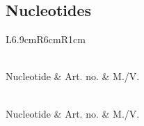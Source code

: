 \subsection{Nucleotides}
{
\setlength{\tabcolsep}{5pt}
\begin{longtable}{L{6.9cm}R{6cm}R{1cm}}
	\caption[List of Nucleotides Used in This Work]{List of nucleotides used in this work. Abbreviations: Art. no.: Article number; M./V.: Manufacturer or vendor.\label{tbl-mat-nuc}}\\
	\toprule
	{Nucleotide} & {Art. no.} & {M./V.} \\
	\hline \endfirsthead
	\caption[]{\textit{continued from the previous page}} \\
	\toprule
	{Nucleotide} & {Art. no.} & {M./V.} \\
	\hline \endhead
	\hline
	 \\
	\endfoot
	\bottomrule
	\endlastfoot
\end{longtable}
}

